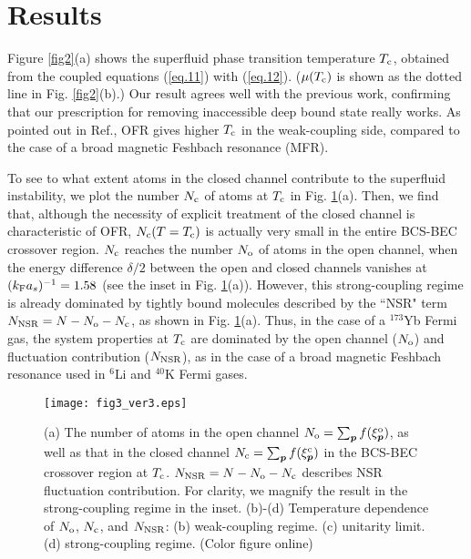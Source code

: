 \documentclass[a4paper]{jpconf}
\begin{document}
\section {Results}
\par
Figure \ref{fig2}(a) shows the superfluid phase transition temperature $T_{\rm c}$, obtained from the coupled equations (\ref{eq.11}) with (\ref{eq.12}). ($\mu(T_{\rm c})$ is shown as the dotted line in Fig. \ref{fig2}(b).) Our result agrees well with the previous work\cite{Junjin}, confirming that our prescription for removing inaccessible deep bound state really works. As pointed out in Ref.\cite{Junjin}, OFR gives higher $T_{\rm c}$ in the weak-coupling side, compared to the case of a broad magnetic Feshbach resonance (MFR).
\par
To see to what extent atoms in the closed channel contribute to the superfluid instability, we plot the number $N_{\rm c}$ of atoms at $T_{\rm c}$ in Fig. \ref{fig3}(a). Then, we find that, although the necessity of explicit treatment of the closed channel is characteristic of OFR, $N_{\rm c}(T=T_{\rm c})$ is actually very small in the entire BCS-BEC crossover region. $N_{\rm c}$ reaches the number $N_{\rm o}$ of atoms in the open channel, when the energy difference $\delta/2$ between the open and closed channels vanishes at $(k_{\rm F}a_s)^{-1}=1.58$ (see the inset in Fig. \ref{fig3}(a)). However, this strong-coupling regime is already dominated by tightly bound molecules described by the ``NSR" term $N_{\rm NSR}=N-N_{\rm o}-N_{\rm c}$, as shown in Fig. \ref{fig3}(a). Thus, in the case of a $^{173}$Yb Fermi gas, the system properties at $T_{\rm c}$ are dominated by the open channel ($N_{\rm o}$) and fluctuation contribution ($N_{\rm NSR}$), as in the case of a broad magnetic Feshbach resonance used in $^6$Li and $^{40}$K Fermi gases.
\par
\begin{figure}[t]
\center
\texttt{[image: fig3\_ver3.eps]}
\caption{(a) The number of atoms in the open channel $N_{\rm o}=\sum_{\bm p}f(\xi_{\bm p}^{\rm o})$, as well as that in the closed channel $N_{\rm c}=\sum_{\bm p}f(\xi_{\bm p}^{\rm c})$ in the BCS-BEC crossover region at $T_{\rm c}$. $N_{\rm NSR}=N-N_{\rm o}-N_{\rm c}$ describes NSR fluctuation contribution. For clarity, we magnify the result in the strong-coupling regime in the inset. (b)-(d) Temperature dependence of $N_{\rm o}$, $N_{\rm c}$, and $N_{\rm NSR}$: (b) weak-coupling regime. (c) unitarity limit. (d) strong-coupling regime. (Color figure online)}
\label{fig3}
\end{figure}
\end{document}
